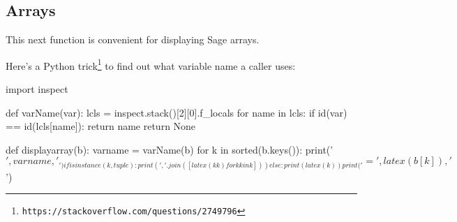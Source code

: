 \subsection{Arrays}

This next function is convenient for displaying Sage arrays.

Here's a Python trick\footnote{\tt https://stackoverflow.com/questions/2749796}
to find out what variable name a caller uses:

\begin{sagecommon}
import inspect

def varName(var):
    lcls = inspect.stack()[2][0].f_locals
    for name in lcls:
        if id(var) == id(lcls[name]):
            return name
    return None

def displayarray(b):
   varname = varName(b)
   for k in sorted(b.keys()):
     print('$$', varname, '_{')
     if isinstance(k, tuple):
       print(','.join([latex(kk) for kk in k]))
     else:
       print(latex(k))
     print('}=', latex(b[k]), '$$')
\end{sagecommon}
